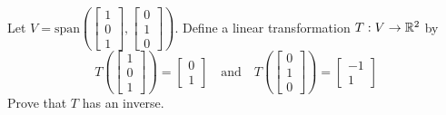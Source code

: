 \documentclass{ximera}
\begin{document}
 \begin{problem}\label{prob:inverses5}
 Let $V=\text{span}\left(\begin{bmatrix}1\\0\\1\end{bmatrix}, \begin{bmatrix}0\\1\\0\end{bmatrix}\right)$.  Define a linear transformation $T:V\rightarrow \mathbb{R}^2$ by
 $$T\left(\begin{bmatrix}1\\0\\1\end{bmatrix}\right)=\begin{bmatrix}0\\1\end{bmatrix}\quad \text{and}\quad T\left(\begin{bmatrix}0\\1\\0\end{bmatrix}\right)=\begin{bmatrix}-1\\1\end{bmatrix}$$
 Prove that $T$ has an inverse.
 \end{problem}
\end{document}
